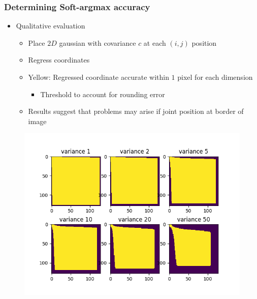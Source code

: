 \documentclass[9pt]{beamer}
\newenvironment{myframe}[1][]{%
\begin{frame}%
\frametitle{#1}
\setcounter{footnote}{0}


}{%
\end{frame}%
}
\begin{document}
\begin{myframe}[Determining Soft-argmax accuracy]
    \begin{itemize}
        \item Qualitative evaluation
        \begin{itemize}
            \item Place $2D$ gaussian with covariance $c$ at each $(i,j)$ position
            \item Regress coordinates
            \item Yellow: Regressed coordinate accurate within $1$ pixel for each dimension
            \begin{itemize}
                \item Threshold to account for rounding error
            \end{itemize}
            \item Results suggest that problems may arise if joint position at border of image
        \end{itemize}
    \end{itemize}
    \begin{figure}
        \includegraphics[height=.60\textheight]{softargmax_variance_test.png}
        \centering
    \end{figure}    
\end{myframe}
\end{document}
